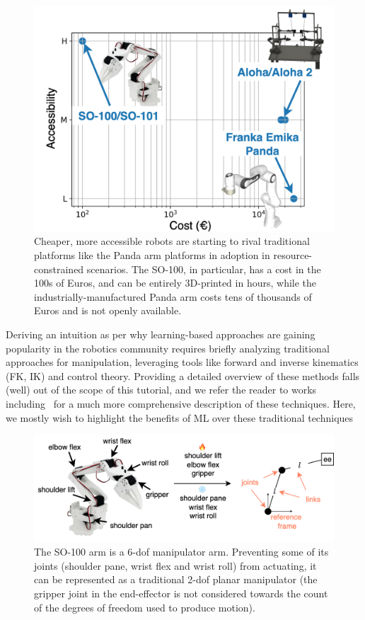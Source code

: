 \begin{figure}
    \centering
    \includegraphics[width=0.4\linewidth]{figures/ch2/ch2-cost-accessibility.png}
    \caption{Cheaper, more accessible robots are starting to rival traditional platforms like the Panda arm platforms in adoption in resource-constrained scenarios. The SO-100, in particular, has a cost in the 100s of Euros, and can be entirely 3D-printed in hours, while the industrially-manufactured Panda arm costs tens of thousands of Euros and is not openly available.}
    \label{fig:robotic-platforms-costs}
\end{figure}

Deriving an intuition as per why learning-based approaches are gaining popularity in the robotics community requires briefly analyzing traditional approaches for manipulation, leveraging tools like forward and inverse kinematics (FK, IK) and control theory.
Providing a detailed overview of these methods falls (well) out of the scope of this tutorial, and we refer the reader to works including~\citet{sicilianoSpringerHandbookRobotics2016, lynchModernRoboticsMechanics2017, tedrakeRoboticManipulationPerception, tedrakeUnderactuatedRoboticsAlgorithms} for a much more comprehensive description of these techniques.
Here, we mostly wish to highlight the benefits of ML over these traditional techniques

\begin{figure}
    \centering
    \includegraphics[width=0.7\linewidth]{figures/ch2/ch2-so100-to-planar-manipulator.png}
    \caption{The SO-100 arm is a 6-dof manipulator arm. Preventing some of its joints (shoulder pane, wrist flex and wrist roll) from actuating, it can be represented as a traditional 2-dof planar manipulator (the gripper joint in the end-effector is not considered towards the count of the degrees of freedom used to produce motion).}
    \label{fig:make-so100-planar-manipulator}
\end{figure}

